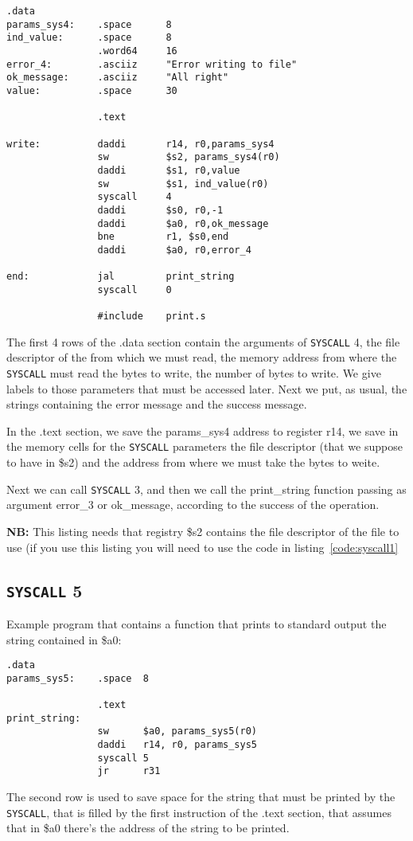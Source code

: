 \documentclass[12pt]{report}
\newcommand{\SC}{\texttt{SYSCALL}}
\newcommand{\OF}{\textbf{NB:} This listing needs that registry \$s2 contains the
file descriptor of the file to use (if you use this listing you will need to use
the code in listing~\ref{code:syscall1}}
\begin{document}
\begin{lstlisting}[caption={\SC{} 4 example}, label={code:syscall4}, style={mips}]
                .data
params_sys4:    .space      8                
ind_value:      .space      8            
                .word64     16        
error_4:        .asciiz     "Error writing to file"    
ok_message:     .asciiz     "All right"    
value:          .space      30                    

                .text
            
write:          daddi       r14, r0,params_sys4        
                sw          $s2, params_sys4(r0)        
                daddi       $s1, r0,value            
                sw          $s1, ind_value(r0)            
                syscall     4                
                daddi       $s0, r0,-1
                daddi       $a0, r0,ok_message            
                bne         r1, $s0,end            
                daddi       $a0, r0,error_4

end:            jal         print_string
                syscall     0
        
                #include    print.s 
\end{lstlisting}

The first 4 rows of the .data section contain the arguments of \SC{} 4, the file
descriptor of the from which we must read, the memory address from where the \SC{}
must read the bytes to write, the number of bytes to write. We give labels to those
parameters that must be accessed later.  Next we put, as usual, the strings
containing the error message and the success message.

In the .text section, we save the params\_sys4 address to register r14, we save
in the memory cells for the \SC{} parameters the file descriptor (that we
suppose to have in \$s2) and the address from where we must take the bytes to
weite.

Next we can call \SC{} 3, and then we call the print\_string function passing as
argument error\_3 or ok\_message, according to the success of the operation.

\OF{}

\subsection{\SC{} 5}
Example program that contains a function that prints to standard output the
string contained in \$a0:
\begin{lstlisting}[caption={\SC{} 5 example}, label={code:syscall5}, style={mips}]
                .data
params_sys5:    .space  8

                .text
print_string:   
                sw      $a0, params_sys5(r0)    
                daddi   r14, r0, params_sys5
                syscall 5
                jr      r31
\end{lstlisting}
The second row is used to save space for the string that must be printed by the
\SC{}, that is filled by the first instruction of the .text section, that
assumes that in \$a0 there's the address of the string to be printed.
\end{document}
